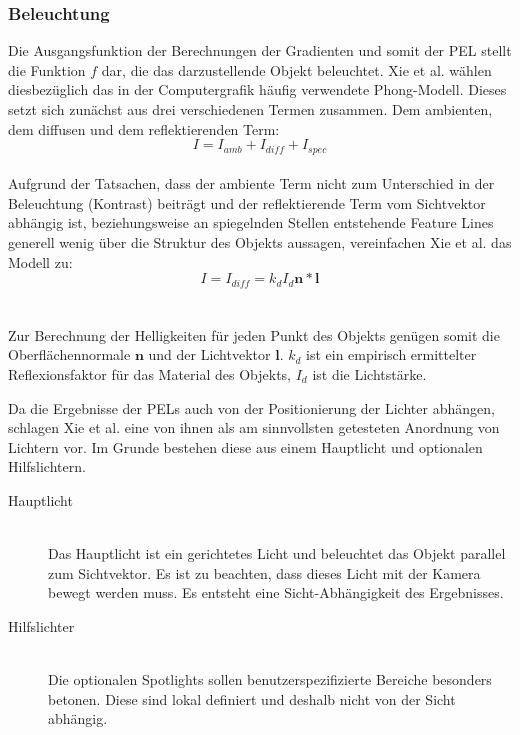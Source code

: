 \documentclass{paperStyle}
\begin{document}
\subsubsection{Beleuchtung}
Die Ausgangsfunktion der Berechnungen der Gradienten und somit der PEL stellt die Funktion $f$ dar, die das darzustellende Objekt beleuchtet.
Xie et al. wählen diesbezüglich das in der Computergrafik häufig verwendete Phong-Modell.
Dieses setzt sich zunächst aus drei verschiedenen Termen zusammen. Dem ambienten, dem diffusen und dem reflektierenden Term:
\begin{equation}
I = I_{amb} + I_{diff} + I_{spec}
\end{equation}
\\
Aufgrund der Tatsachen, dass der ambiente Term nicht zum Unterschied in der Beleuchtung (Kontrast) beiträgt und der reflektierende Term vom Sichtvektor abhängig ist, beziehungsweise an spiegelnden Stellen entstehende Feature Lines generell wenig über die Struktur des Objekts aussagen, vereinfachen Xie et al. das Modell zu:
\begin{equation}
I = I_{diff} = k_{d}I_{d}\mathbf{n}*\mathbf{l}
\end{equation}
\\\\
Zur Berechnung der Helligkeiten für jeden Punkt des Objekts genügen somit die Oberflächennormale $\mathbf{n}$ und der Lichtvektor $\mathbf{l}$. $k_{d}$ ist ein empirisch ermittelter Reflexionsfaktor für das Material des Objekts, $I_{d}$ ist die Lichtstärke.

\label{belfkt}
Da die Ergebnisse der PELs auch von der Positionierung der Lichter abhängen, schlagen Xie et al. eine von ihnen als am sinnvollsten getesteten Anordnung von Lichtern vor. Im Grunde bestehen diese aus einem Hauptlicht und optionalen Hilfslichtern.
\begin{description}
\item[Hauptlicht]\hfill \\
Das Hauptlicht ist ein gerichtetes Licht und beleuchtet das Objekt parallel zum Sichtvektor. Es ist zu beachten, dass dieses Licht mit der Kamera bewegt werden muss. Es entsteht eine Sicht-Abhängigkeit des Ergebnisses. \\
\item[Hilfslichter]\hfill \\
Die optionalen Spotlights sollen benutzerspezifizierte Bereiche besonders betonen. Diese sind lokal definiert und deshalb nicht von der Sicht abhängig.
\end{description}
\end{document}
